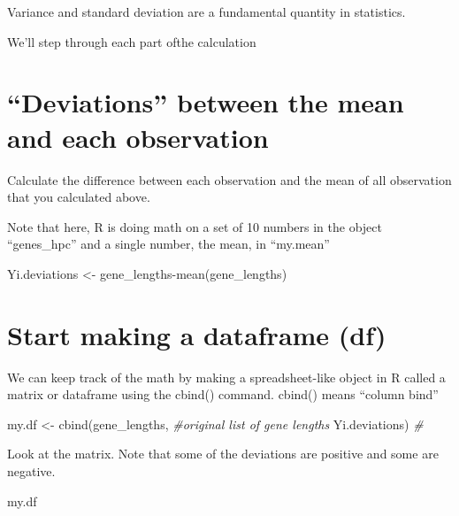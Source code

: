 \documentclass[
]{book}
\newenvironment{Shaded}{\begin{snugshade}}{\end{snugshade}}
\newcommand{\CommentTok}[1]{\textcolor[rgb]{0.56,0.35,0.01}{\textit{#1}}}
\newcommand{\FunctionTok}[1]{\textcolor[rgb]{0.00,0.00,0.00}{#1}}
\newcommand{\NormalTok}[1]{#1}
\newcommand{\OtherTok}[1]{\textcolor[rgb]{0.56,0.35,0.01}{#1}}
\newcommand{\SpecialCharTok}[1]{\textcolor[rgb]{0.00,0.00,0.00}{#1}}
\begin{document}
Variance and standard deviation are a fundamental quantity in statistics.

We'll step through each part ofthe calculation

\hypertarget{deviations-between-the-mean-and-each-observation}{%
\section{``Deviations'' between the mean and each observation}\label{deviations-between-the-mean-and-each-observation}}

Calculate the difference between each observation and the mean of all observation that you calculated above.

Note that here, R is doing math on a set of 10 numbers in the object ``genes\_hpc'' and a single number, the mean, in ``my.mean''

\begin{Shaded}
\begin{Highlighting}[]
\NormalTok{Yi.deviations }\OtherTok{\textless{}{-}}\NormalTok{ gene\_lengths}\SpecialCharTok{{-}}\FunctionTok{mean}\NormalTok{(gene\_lengths)}
\end{Highlighting}
\end{Shaded}

\hypertarget{start-making-a-dataframe-df}{%
\section{Start making a dataframe (df)}\label{start-making-a-dataframe-df}}

We can keep track of the math by making a spreadsheet-like object in R called a matrix or dataframe using the cbind() command. cbind() means ``column bind''

\begin{Shaded}
\begin{Highlighting}[]
\NormalTok{my.df }\OtherTok{\textless{}{-}} \FunctionTok{cbind}\NormalTok{(gene\_lengths,      }\CommentTok{\#original list of gene lengths}
\NormalTok{               Yi.deviations) }\CommentTok{\#}
\end{Highlighting}
\end{Shaded}

Look at the matrix. Note that some of the deviations are positive and some are negative.

\begin{Shaded}
\begin{Highlighting}[]
\NormalTok{my.df}
\end{Highlighting}
\end{Shaded}
\end{document}
